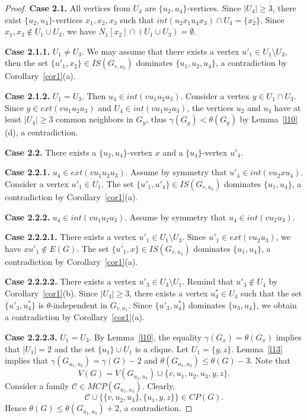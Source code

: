 \documentclass[12pt]{article}
\begin{document}
\begin{proof}
\textbf{Case 2.1.} All vertices from $U_4$ are $\{u_2,u_4\}$-vertices. Since $|U_4| \geq 3$, there exist $\{u_2,u_4\}$-vertices $x_1,x_2,x_3$ such that $ int(u_2x_1u_4x_3) \cap U_4 = \{x_2\}$. Since $x_1,x_3 \notin U_1 \cup U_3$, we have $N_1[x_2] \cap (U_1 \cup U_3) = \emptyset$. 

\textbf{Case 2.1.1.} $U_1 \neq U_3$. We may assume that there exists a vertex $u'_1 \in U_1 \setminus U_3$, then the set $\{u'_1,x_2\} \in IS(G_{v,u_3})$ dominates $\{u_1,u_2,u_4\}$, a contradiction by Corollary~\ref{cor1}(a).

\textbf{Case 2.1.2.} $U_1 = U_3$. Then $u_4 \in int(vu_1u_2u_3)$. Consider a vertex $y \in U_1 \cap U_3$. Since $y \in ext(vu_1u_2u_3)$ and $U_4 \in int(vu_1u_2u_3)$, the vertices $u_2$ and $u_4$ have at least $|U_4| \geq 3$ common neighbors in $G_{y}$, thus $\gamma(G_{y}) < \theta(G_{y})$ by Lemma~\ref{l10}(d), a contradiction.
 
\textbf{Case 2.2.} There exists a $\{u_2,u_4\}$-vertex $x$ and a $\{u_4\}$-vertex $u'_4$. 

\textbf{Case 2.2.1.} $u_4 \in ext(vu_1u_2u_3)$. Assume by symmetry that $u'_4 \in int(vu_2xu_4)$. Consider a vertex $u'_1 \in U_1$. The set $\{u'_1,u'_4\} \in IS(G_{v,u_3})$ dominates $\{u_1,u_4\}$, a contradiction by Corollary~\ref{cor1}(a). 

\textbf{Case 2.2.2.} $u_4 \in int(vu_1u_2u_3)$. Assume by symmetry that $u_4 \in int(vu_2u_3)$.

\textbf{Case 2.2.2.1.} There exists a vertex $u'_1 \in U_1 \setminus U_3$. Since $u'_1 \in ext(vu_2u_3)$, we have $xu'_1 \notin E(G)$. The set $\{u'_1,x\} \in IS(G_{v,u_3})$ dominates $\{u_1,u_4\}$, a contradiction by Corollary~\ref{cor1}(a). 

\textbf{Case 2.2.2.2.} There exists a vertex $u'_3 \in U_3 \setminus U_1$. Remind that $u'_3 \notin U_4$ by Corollary~\ref{cor1}(b). Since $|U_4| \geq 3$, there exists a vertex $u^*_4 \in U_4$ such that the set $\{u'_3,u^*_4\}$ is $\theta$-independent in $G_{v,u_1}$. Since $\{u'_3,u^*_4\}$ dominates $\{u_3,u_4\}$, we obtain a contradiction by Corollary~\ref{cor1}(a). 

\textbf{Case 2.2.2.3.} $U_1 = U_3$. By Lemma~\ref{l10}, the equality $\gamma(G_x) = \theta(G_x)$ implies that $|U_1| = 2$ and the set $\{u_1\} \cup U_1$ is a clique. Let $U_1 = \{y,z\}$. Lemma~\ref{l13} implies that $\gamma(G_{u_1,u_3}) = \gamma(G) - 2$ and $\theta(G_{u_1,u_3}) \leq \theta(G) - 3$.  Note that $$V(G) = V(G_{u_1,u_3}) \cup \{v,u_1,u_2,u_3,y,z\}.$$ Consider a family $\mathcal{C} \in MCP(G_{u_1,u_3})$. Clearly, $$\mathcal{C} \cup \{\{v,u_2,u_3\},\{u_1,y,z\}\} \in CP(G).$$ Hence $\theta(G) \leq \theta(G_{u_1,u_3}) + 2$, a contradiction.


\end{proof}
\end{document}

